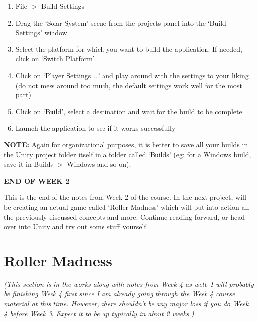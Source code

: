 \documentclass{article}[a4paper,12pt]
\theoremstyle{definition}
\begin{document}
\begin{enumerate}
	\item File $>$ Build Settings
	\item Drag the `Solar System' scene from the projects panel into the `Build Settings' window
	\item Select the platform for which you want to build the application. If needed, click on `Switch Platform'
	\item Click on `Player Settings ...' and play around with the settings to your liking (do not mess around too much, the default settings work well for the most part)
	\item Click on `Build', select a destination and wait for the build to be complete
	\item Launch the application to see if it works successfully
\end{enumerate}
\textbf{NOTE:} Again for organizational purposes, it is better to save all your builds in the Unity project folder itself in a folder called `Builds' (eg: for a Windows build, save it in Builds $>$ Windows and so on).

\hrulefill
\begin{center}\textbf{END OF WEEK 2}\end{center}
This is the end of the notes from Week 2 of the course. In the next project, will be creating an actual game called `Roller Madness' which will put into action all the previously discussed concepts and more. Continue reading forward, or head over into Unity and try out some stuff yourself.

\hrulefill
\pagebreak
\section{Roller Madness}
\textit{(This section is in the works along with notes from Week 4 as well. I will probably be finishing Week 4 first since I am already going through the Week 4 course material at this time. However, there shouldn't be any major loss if you do Week 4 before Week 3. Expect it to be up typically in about 2 weeks.)}

\hrulefill
\end{document}

